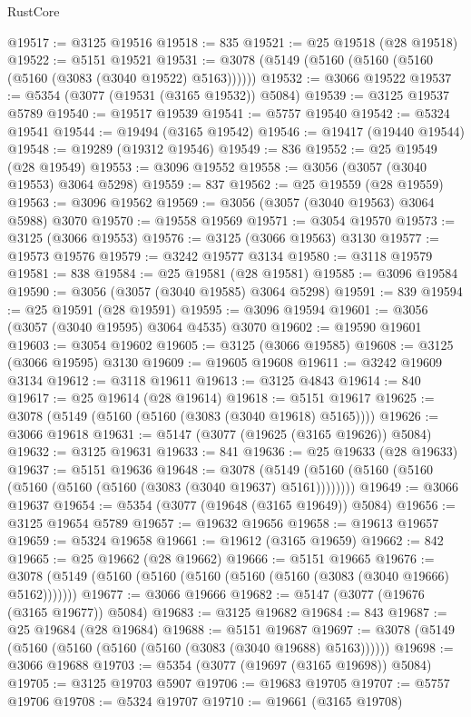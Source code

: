 \begin{lexlean}{RustCore}
\begin{coremodule}
@19517 := @3125 @19516
@19518 := 835
@19521 := @25 @19518 (@28 @19518)
@19522 := @5151 @19521
@19531 := @3078 (@5149 (@5160 (@5160 (@5160 (@5160 (@3083 (@3040 @19522) @5163))))))
@19532 := @3066 @19522
@19537 := @5354 (@3077 (@19531 (@3165 @19532)) @5084)
@19539 := @3125 @19537 @5789
@19540 := @19517 @19539
@19541 := @5757 @19540
@19542 := @5324 @19541
@19544 := @19494 (@3165 @19542)
@19546 := @19417 (@19440 @19544)
@19548 := @19289 (@19312 @19546)
@19549 := 836
@19552 := @25 @19549 (@28 @19549)
@19553 := @3096 @19552
@19558 := @3056 (@3057 (@3040 @19553) @3064 @5298)
@19559 := 837
@19562 := @25 @19559 (@28 @19559)
@19563 := @3096 @19562
@19569 := @3056 (@3057 (@3040 @19563) @3064 @5988) @3070
@19570 := @19558 @19569
@19571 := @3054 @19570
@19573 := @3125 (@3066 @19553)
@19576 := @3125 (@3066 @19563) @3130
@19577 := @19573 @19576
@19579 := @3242 @19577 @3134
@19580 := @3118 @19579
@19581 := 838
@19584 := @25 @19581 (@28 @19581)
@19585 := @3096 @19584
@19590 := @3056 (@3057 (@3040 @19585) @3064 @5298)
@19591 := 839
@19594 := @25 @19591 (@28 @19591)
@19595 := @3096 @19594
@19601 := @3056 (@3057 (@3040 @19595) @3064 @4535) @3070
@19602 := @19590 @19601
@19603 := @3054 @19602
@19605 := @3125 (@3066 @19585)
@19608 := @3125 (@3066 @19595) @3130
@19609 := @19605 @19608
@19611 := @3242 @19609 @3134
@19612 := @3118 @19611
@19613 := @3125 @4843
@19614 := 840
@19617 := @25 @19614 (@28 @19614)
@19618 := @5151 @19617
@19625 := @3078 (@5149 (@5160 (@5160 (@3083 (@3040 @19618) @5165))))
@19626 := @3066 @19618
@19631 := @5147 (@3077 (@19625 (@3165 @19626)) @5084)
@19632 := @3125 @19631
@19633 := 841
@19636 := @25 @19633 (@28 @19633)
@19637 := @5151 @19636
@19648 := @3078 (@5149 (@5160 (@5160 (@5160 (@5160 (@5160 (@5160 (@3083 (@3040 @19637) @5161))))))))
@19649 := @3066 @19637
@19654 := @5354 (@3077 (@19648 (@3165 @19649)) @5084)
@19656 := @3125 @19654 @5789
@19657 := @19632 @19656
@19658 := @19613 @19657
@19659 := @5324 @19658
@19661 := @19612 (@3165 @19659)
@19662 := 842
@19665 := @25 @19662 (@28 @19662)
@19666 := @5151 @19665
@19676 := @3078 (@5149 (@5160 (@5160 (@5160 (@5160 (@5160 (@3083 (@3040 @19666) @5162)))))))
@19677 := @3066 @19666
@19682 := @5147 (@3077 (@19676 (@3165 @19677)) @5084)
@19683 := @3125 @19682
@19684 := 843
@19687 := @25 @19684 (@28 @19684)
@19688 := @5151 @19687
@19697 := @3078 (@5149 (@5160 (@5160 (@5160 (@5160 (@3083 (@3040 @19688) @5163))))))
@19698 := @3066 @19688
@19703 := @5354 (@3077 (@19697 (@3165 @19698)) @5084)
@19705 := @3125 @19703 @5907
@19706 := @19683 @19705
@19707 := @5757 @19706
@19708 := @5324 @19707
@19710 := @19661 (@3165 @19708)

\end{coremodule}
\end{lexlean}
